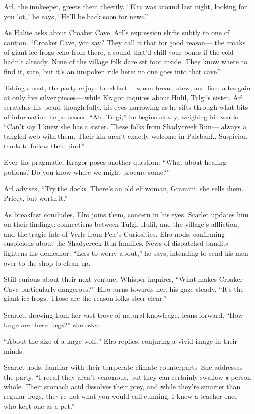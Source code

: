 \documentclass[
  letterpaper,12pt,twoside,twocolumn,openany,
  nodeprecatedcode,bg=full]{dndbook}
\begin{document}
Arl, the innkeeper, greets them cheerily. ``Elro was around last night,
looking for you lot,'' he says, ``He'll be back soon for news.''

As Halite asks about Croaker Cave, Arl's expression shifts subtly to one
of caution. ``Croaker Cave, you say? They call it that for good
reason--- the croaks of giant ice frogs echo from there, a sound that'd
chill your bones if the cold hadn't already. None of the village folk
dare set foot inside. They know where to find it, sure, but it's an
unspoken rule here: no one goes into that cave.''

Taking a seat, the party enjoys breakfast--- warm bread, stew, and fish;
a bargain at only five silver pieces--- while Kragor inquires about
Hulil, Tulgi's sister. Arl scratches his beard thoughtfully, his eyes
narrowing as he sifts through what bits of information he possesses.
``Ah, Tulgi,'' he begins slowly, weighing his words. ``Can't say I knew
she has a sister. These folks from Shadycreek Run--- always a tangled
web with them. Their kin aren't exactly welcome in Palebank. Suspicion
tends to follow their kind.''

Ever the pragmatic, Kragor poses another question: ``What about healing
potions? Do you know where we might procure some?''

Arl advises, ``Try the docks. There's an old elf woman, Gramini, she
sells them. Pricey, but worth it.''

As breakfast concludes, Elro joins them, concern in his eyes. Scarlet
updates him on their findings: connections between Tulgi, Hulil, and the
village's affliction, and the tragic fate of Verla from Pelc's
Curiosities. Elro nods, confirming suspicions about the Shadycreek Run
families. News of dispatched bandits lightens his demeanor. ``Less to
worry about,'' he says, intending to send his men over to the shop to
clean up.

Still curious about their next venture, Whisper inquires, ``What makes
Croaker Cave particularly dangerous?'' Elro turns towards her, his gaze
steady. ``It's the giant ice frogs. Those are the reason folks steer
clear.''

Scarlet, drawing from her vast trove of natural knowledge, leans
forward. ``How large are these frogs?'' she asks.

``About the size of a large wolf,'' Elro replies, conjuring a vivid
image in their minds.

Scarlet nods, familiar with their temperate climate counterparts. She
addresses the party. ``I recall they aren't venomous, but they can
certainly swallow a person whole. Their stomach acid dissolves their
prey, and while they're smarter than regular frogs, they're not what you
would call cunning. I knew a teacher once who kept one as a pet.''
\end{document}

